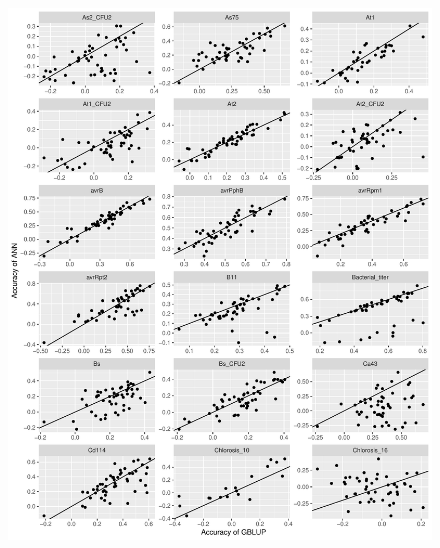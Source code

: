 \begin{figure}[H]
  \centering \includegraphics[height=1.05\textheight, width=1.1\textwidth]{Figures/cor_plots_1}
  \decoRule
 \label{fig:bla}
\end{figure}


